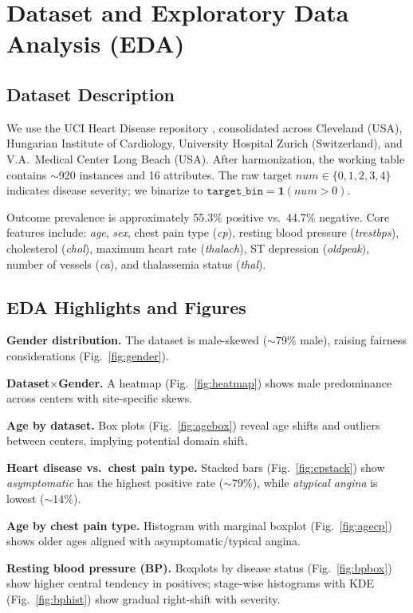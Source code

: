 \documentclass[conference]{IEEEtran}
\begin{document}
\section{Dataset and Exploratory Data Analysis (EDA)}
\subsection{Dataset Description}
We use the UCI Heart Disease repository \cite{uci1988}, consolidated across Cleveland (USA), Hungarian Institute of Cardiology, University Hospital Zurich (Switzerland), and V.A.\ Medical Center Long Beach (USA). After harmonization, the working table contains \(\sim\)920 instances and 16 attributes. The raw target \(num \in \{0,1,2,3,4\}\) indicates disease severity; we binarize to \(\texttt{target\_bin} = \mathbf{1}(num>0)\).

Outcome prevalence is approximately 55.3\% positive vs.\ 44.7\% negative. Core features include: \textit{age}, \textit{sex}, chest pain type (\textit{cp}), resting blood pressure (\textit{trestbps}), cholesterol (\textit{chol}), maximum heart rate (\textit{thalach}), ST depression (\textit{oldpeak}), number of vessels (\textit{ca}), and thalassemia status (\textit{thal}).

\subsection{EDA Highlights and Figures}
\textbf{Gender distribution.} The dataset is male-skewed (\(\sim\)79\% male), raising fairness considerations (Fig.~\ref{fig:gender}).

\textbf{Dataset$\times$Gender.} A heatmap (Fig.~\ref{fig:heatmap}) shows male predominance across centers with site-specific skews.

\textbf{Age by dataset.} Box plots (Fig.~\ref{fig:agebox}) reveal age shifts and outliers between centers, implying potential domain shift.

\textbf{Heart disease vs.\ chest pain type.} Stacked bars (Fig.~\ref{fig:cpstack}) show \textit{asymptomatic} has the highest positive rate ($\sim$79\%), while \textit{atypical angina} is lowest ($\sim$14\%).

\textbf{Age by chest pain type.} Histogram with marginal boxplot (Fig.~\ref{fig:agecp}) shows older ages aligned with asymptomatic/typical angina.

\textbf{Resting blood pressure (BP).} Boxplots by disease status (Fig.~\ref{fig:bpbox}) show higher central tendency in positives; stage-wise histograms with KDE (Fig.~\ref{fig:bphist}) show gradual right-shift with severity.
\end{document}
